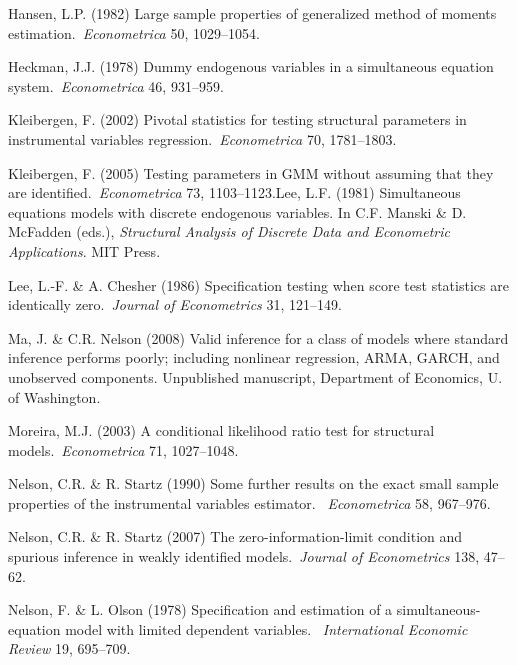\documentclass[12pt,titlepage,final,oneside,letterpaper]{article}
\begin{document}
\begin{description}
\item Hansen, L.P. (1982) Large sample properties of generalized method of
moments estimation.\ \emph{Econometrica} 50, 1029--1054.

\item Heckman, J.J. (1978) Dummy endogenous variables in a simultaneous
equation system.\ \emph{Econometrica} 46, 931--959.

\item Kleibergen, F. (2002) Pivotal statistics for testing structural
parameters in instrumental variables regression.\ \emph{Econometrica} 70,
1781--1803.

\item Kleibergen, F. (2005) Testing parameters in GMM without assuming that
they are identified.\ \emph{Econometrica} 73, 1103--1123.Lee, L.F. (1981)
Simultaneous equations models with discrete endogenous variables. In C.F.
Manski \& D. McFadden (eds.), \emph{Structural Analysis of Discrete Data and
Econometric Applications}. MIT Press.

\item Lee, L.-F. \& A. Chesher (1986) Specification testing when score test
statistics are identically zero.\ \emph{Journal of Econometrics }31,
121--149.

\item Ma, J. \& C.R. Nelson (2008) Valid inference for a class of models
where standard inference performs poorly; including nonlinear regression,
ARMA, GARCH, and unobserved components. Unpublished manuscript, Department
of Economics, U. of Washington.

\item Moreira, M.J. (2003) A conditional likelihood ratio test for
structural models.\ \emph{Econometrica} 71, 1027--1048.

\item Nelson, C.R. \& R. Startz (1990) Some further results on the exact
small sample properties of the instrumental variables estimator.\ \emph{%
Econometrica} 58, 967--976.

\item Nelson, C.R. \& R. Startz (2007) The zero-information-limit condition
and spurious inference in weakly identified models.\ \emph{Journal of
Econometrics} 138, 47--62.

\item Nelson, F. \& L. Olson (1978) Specification and estimation of a
simultaneous-equation model with limited dependent variables.\ \emph{%
International Economic Review }19, 695--709.


\end{description}
\end{document}
